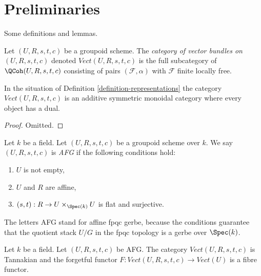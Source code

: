 \section{Preliminaries}
\label{section-preliminaries}

\noindent
Some definitions and lemmas.

\begin{definition}
\label{definition-representations}
Let $(U, R, s, t, c)$ be a groupoid scheme. The
{\it category of vector bundles on $(U, R, s, t, c)$} denoted
$\textit{Vect}(U, R, s, t, c)$ is the full subcategory of
$\QCoh(U, R, s, t, c)$ consisting of pairs $(\mathcal{F}, \alpha)$
with $\mathcal{F}$ finite locally free.
\end{definition}

\begin{lemma}
\label{lemma-vector-bundles-on-groupoid}
In the situation of Definition \ref{definition-representations}
the category $\textit{Vect}(U, R, s, t, c)$ is an additive symmetric
monoidal category where every object has a dual.
\end{lemma}

\begin{proof}
Omitted.
\end{proof}

\begin{definition}
\label{definition-affine-fpqc-gerbe}
Let $k$ be a field. Let $(U, R, s, t, c)$ be a groupoid scheme over $k$.
We say $(U, R, s, t, c)$ is {\it AFG} if the following conditions hold:
\begin{enumerate}
\item $U$ is not empty,
\item $U$ and $R$ are affine,
\item $(s, t) : R \to U \times_{\Spec(k)} U$ is flat and surjective.
\end{enumerate}
\end{definition}

\noindent
The letters AFG stand for affine fpqc gerbe, because the conditions guarantee
that the quotient stack $U/G$ in the fpqc topology is a gerbe over $\Spec(k)$.

\begin{lemma}
\label{lemma-vector-bundles-on-groupoid}
Let $k$ be a field. Let $(U, R, s, t, c)$ be AFG. The category
$\textit{Vect}(U, R, s, t, c)$ is Tannakian and the forgetful
functor $F : \textit{Vect}(U, R, s, t, c) \to \textit{Vect}(U)$
is a fibre functor.
\end{lemma}

